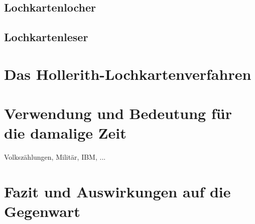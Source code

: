 \documentclass{scrartcl}
\begin{document}
\subsection{Lochkartenlocher}
\subsection{Lochkartenleser}

\section{Das Hollerith-Lochkartenverfahren}


\section{Verwendung und Bedeutung für die damalige Zeit}

Volkszählungen, Militär, IBM, ...



\section{Fazit und Auswirkungen auf die Gegenwart}





\end{document}
